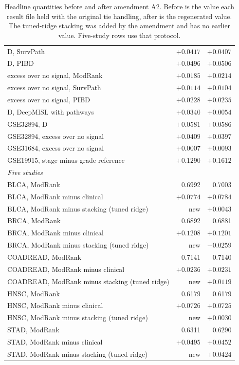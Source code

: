 \documentclass[11pt]{article}
\begin{document}
\begin{table}[h]
{\begin{tabular}{lrr}
D, SurvPath & $+0.0417$ & $+0.0407$ \\
D, PIBD & $+0.0496$ & $+0.0506$ \\
excess over no signal, ModRank & $+0.0185$ & $+0.0214$ \\
excess over no signal, SurvPath & $+0.0114$ & $+0.0104$ \\
excess over no signal, PIBD & $+0.0228$ & $+0.0235$ \\
D, DeepMISL with pathways & $+0.0340$ & $+0.0054$ \\
GSE32894, D & $+0.0581$ & $+0.0586$ \\
GSE32894, excess over no signal & $+0.0409$ & $+0.0397$ \\
GSE31684, excess over no signal & $+0.0007$ & $+0.0093$ \\
GSE19915, stage minus grade reference & $+0.1290$ & $+0.1612$ \\
\midrule
\multicolumn{3}{l}{\emph{Five studies}} \\
BLCA, ModRank & 0.6992 & 0.7003 \\
BLCA, ModRank minus clinical & $+0.0774$ & $+0.0784$ \\
BLCA, ModRank minus stacking (tuned ridge) & new & $+0.0043$ \\
BRCA, ModRank & 0.6892 & 0.6881 \\
BRCA, ModRank minus clinical & $+0.1208$ & $+0.1201$ \\
BRCA, ModRank minus stacking (tuned ridge) & new & $-0.0259$ \\
COADREAD, ModRank & 0.7141 & 0.7140 \\
COADREAD, ModRank minus clinical & $+0.0236$ & $+0.0231$ \\
COADREAD, ModRank minus stacking (tuned ridge) & new & $+0.0119$ \\
HNSC, ModRank & 0.6179 & 0.6179 \\
HNSC, ModRank minus clinical & $+0.0726$ & $+0.0725$ \\
HNSC, ModRank minus stacking (tuned ridge) & new & $+0.0030$ \\
STAD, ModRank & 0.6311 & 0.6290 \\
STAD, ModRank minus clinical & $+0.0495$ & $+0.0452$ \\
STAD, ModRank minus stacking (tuned ridge) & new & $+0.0424$ \\
\bottomrule
\end{tabular}}
\caption{Headline quantities before and after amendment A2. Before is the value each result file
held with the original tie handling, after is the regenerated value. The tuned-ridge stacking was
added by the amendment and has no earlier value. Five-study rows use that protocol.}
\label{tab:amendA2}
\end{table}
\end{document}
